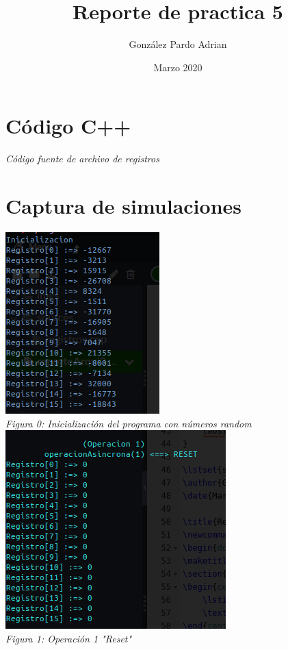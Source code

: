 \documentclass[12pt,executivepaper]{article}
\author{González Pardo Adrian}
\date{Marzo 2020}
\title{Reporte de practica 5}
\begin{document}
\maketitle
\section{Código C++}
\begin{center}
    
    \textit{Código fuente de archivo de registros}\\
\end{center}
\clearpage
\section{Captura de simulaciones}
\begin{center}
    \includegraphics[scale=1]{imgs/uno.png}\\
    \textit{Figura 0: Inicialización del programa con números random}\\
    \includegraphics[scale=1]{imgs/dos.png}\\
    \textit{Figura 1: Operación 1 "Reset"}\\

\end{center}
\end{document}
